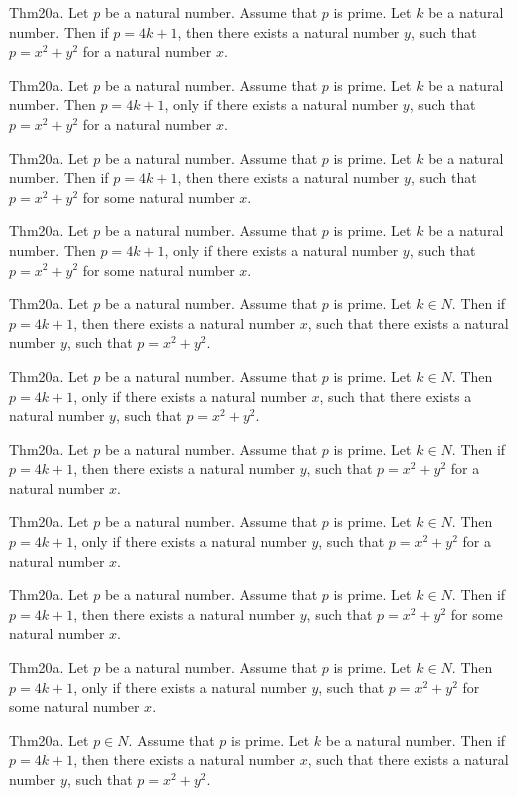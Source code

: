 \documentclass{article}
\begin{document}
Thm20a. Let $p$ be a natural number. Assume that $p$ is prime. Let $k$ be a natural number. Then if $p = 4 k + 1$, then there exists a natural number $y$, such that $p = x ^{ 2}+ y ^{ 2}$ for a natural number $x$.

Thm20a. Let $p$ be a natural number. Assume that $p$ is prime. Let $k$ be a natural number. Then $p = 4 k + 1$, only if there exists a natural number $y$, such that $p = x ^{ 2}+ y ^{ 2}$ for a natural number $x$.

Thm20a. Let $p$ be a natural number. Assume that $p$ is prime. Let $k$ be a natural number. Then if $p = 4 k + 1$, then there exists a natural number $y$, such that $p = x ^{ 2}+ y ^{ 2}$ for some natural number $x$.

Thm20a. Let $p$ be a natural number. Assume that $p$ is prime. Let $k$ be a natural number. Then $p = 4 k + 1$, only if there exists a natural number $y$, such that $p = x ^{ 2}+ y ^{ 2}$ for some natural number $x$.

Thm20a. Let $p$ be a natural number. Assume that $p$ is prime. Let $k \in N$. Then if $p = 4 k + 1$, then there exists a natural number $x$, such that there exists a natural number $y$, such that $p = x ^{ 2}+ y ^{ 2}$.

Thm20a. Let $p$ be a natural number. Assume that $p$ is prime. Let $k \in N$. Then $p = 4 k + 1$, only if there exists a natural number $x$, such that there exists a natural number $y$, such that $p = x ^{ 2}+ y ^{ 2}$.

Thm20a. Let $p$ be a natural number. Assume that $p$ is prime. Let $k \in N$. Then if $p = 4 k + 1$, then there exists a natural number $y$, such that $p = x ^{ 2}+ y ^{ 2}$ for a natural number $x$.

Thm20a. Let $p$ be a natural number. Assume that $p$ is prime. Let $k \in N$. Then $p = 4 k + 1$, only if there exists a natural number $y$, such that $p = x ^{ 2}+ y ^{ 2}$ for a natural number $x$.

Thm20a. Let $p$ be a natural number. Assume that $p$ is prime. Let $k \in N$. Then if $p = 4 k + 1$, then there exists a natural number $y$, such that $p = x ^{ 2}+ y ^{ 2}$ for some natural number $x$.

Thm20a. Let $p$ be a natural number. Assume that $p$ is prime. Let $k \in N$. Then $p = 4 k + 1$, only if there exists a natural number $y$, such that $p = x ^{ 2}+ y ^{ 2}$ for some natural number $x$.

Thm20a. Let $p \in N$. Assume that $p$ is prime. Let $k$ be a natural number. Then if $p = 4 k + 1$, then there exists a natural number $x$, such that there exists a natural number $y$, such that $p = x ^{ 2}+ y ^{ 2}$.
\end{document}
